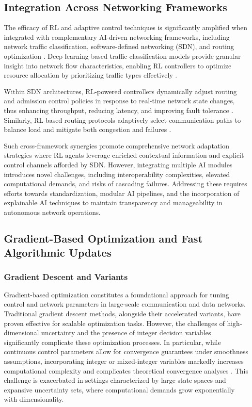 \subsection{Integration Across Networking Frameworks}

The efficacy of RL and adaptive control techniques is significantly amplified when integrated with complementary AI-driven networking frameworks, including network traffic classification, software-defined networking (SDN), and routing optimization \cite{ref51,ref52,ref53}. Deep learning-based traffic classification models provide granular insight into network flow characteristics, enabling RL controllers to optimize resource allocation by prioritizing traffic types effectively \cite{ref51}.

Within SDN architectures, RL-powered controllers dynamically adjust routing and admission control policies in response to real-time network state changes, thus enhancing throughput, reducing latency, and improving fault tolerance \cite{ref52}. Similarly, RL-based routing protocols adaptively select communication paths to balance load and mitigate both congestion and failures \cite{ref53}.

Such cross-framework synergies promote comprehensive network adaptation strategies where RL agents leverage enriched contextual information and explicit control channels afforded by SDN. However, integrating multiple AI modules introduces novel challenges, including interoperability complexities, elevated computational demands, and risks of cascading failures. Addressing these requires efforts towards standardization, modular AI pipelines, and the incorporation of explainable AI techniques to maintain transparency and manageability in autonomous network operations.

\subsection{Gradient-Based Optimization and Fast Algorithmic Updates}

\subsubsection{Gradient Descent and Variants}

Gradient-based optimization constitutes a foundational approach for tuning control and network parameters in large-scale communication and data networks. Traditional gradient descent methods, alongside their accelerated variants, have proven effective for scalable optimization tasks. However, the challenges of high-dimensional uncertainty and the presence of integer decision variables significantly complicate these optimization processes. In particular, while continuous control parameters allow for convergence guarantees under smoothness assumptions, incorporating integer or mixed-integer variables markedly increases computational complexity and complicates theoretical convergence analyses \cite{ref36}. This challenge is exacerbated in settings characterized by large state spaces and expansive uncertainty sets, where computational demands grow exponentially with dimensionality.


